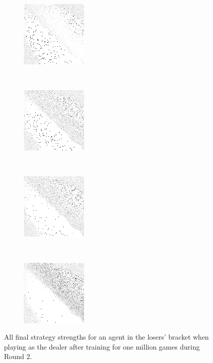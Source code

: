 \begin{figure}
	\begin{subfigure}[t]{0.22\textwidth}
		\includegraphics[width=\stratgraphwidth]{images/findings/round2/strats/loser/crib_min_avg.png}
		\caption{\cribminavg}
	\end{subfigure}
	~
	\begin{subfigure}[t]{0.22\textwidth}
		\includegraphics[width=\stratgraphwidth]{images/findings/round2/strats/loser/pegging_max_avg_gained.png}
		\caption{\peggingmaxavggained}
	\end{subfigure}
	~
	\begin{subfigure}[t]{0.22\textwidth}
		\includegraphics[width=\stratgraphwidth]{images/findings/round2/strats/loser/pegging_max_med_gained.png}
		\caption{\peggingmaxmedgained}
	\end{subfigure}
	~
	\begin{subfigure}[t]{0.22\textwidth}
		\includegraphics[width=\stratgraphwidth]{images/findings/round2/strats/loser/pegging_min_avg_given.png}
		\caption{\peggingminavggiven}
	\end{subfigure}

\caption{
	All final strategy strengths for an agent in the losers' bracket
	when playing as the dealer
	after training for one million games during Round 2.
}
\label{fig:r2-strats-loser}
\end{figure}
